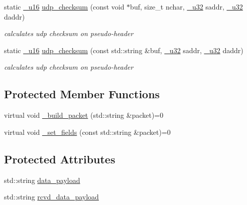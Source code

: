 \begin{CompactItemize}
static \hyperlink{namespacesocketpp_0d48e817f00cbb84d07faec41ee4b169}{\_\-u16} \hyperlink{classsocketpp_1_1RawSocket_25eef0a35fc66b33bed3abd176a5175e}{udp\_\-checksum} (const void $\ast$buf, size\_\-t nchar, \hyperlink{namespacesocketpp_d9c3b2ad093bb5814af59760e0a2192a}{\_\-u32} saddr, \hyperlink{namespacesocketpp_d9c3b2ad093bb5814af59760e0a2192a}{\_\-u32} daddr)
\begin{CompactList}\small\item\em calculates udp checksum on pseudo-header \item\end{CompactList}\item 
static \hyperlink{namespacesocketpp_0d48e817f00cbb84d07faec41ee4b169}{\_\-u16} \hyperlink{classsocketpp_1_1RawSocket_eb3d9cfc5e2893487d7e076ef56693d4}{udp\_\-checksum} (const std::string \&buf, \hyperlink{namespacesocketpp_d9c3b2ad093bb5814af59760e0a2192a}{\_\-u32} saddr, \hyperlink{namespacesocketpp_d9c3b2ad093bb5814af59760e0a2192a}{\_\-u32} daddr)
\begin{CompactList}\small\item\em calculates udp checksum on pseudo-header \item\end{CompactList}\end{CompactItemize}
\subsection*{Protected Member Functions}
\begin{CompactItemize}
\item 
virtual void \hyperlink{classsocketpp_1_1RawSocket_eb0a3f716c0fc46efa4123acf0fe1e66}{\_\-build\_\-packet} (std::string \&packet)=0
\item 
virtual void \hyperlink{classsocketpp_1_1RawSocket_45e6b041703cb8ae0f93dd19766865d5}{\_\-set\_\-fields} (const std::string \&packet)=0
\end{CompactItemize}
\subsection*{Protected Attributes}
\begin{CompactItemize}
\item 
std::string \hyperlink{classsocketpp_1_1RawSocket_4d3a1236c4ac42ab029323ae14586ff8}{data\_\-payload}
\item 
std::string \hyperlink{classsocketpp_1_1RawSocket_3e166c1c401c30b5721dc54f93772b36}{rcvd\_\-data\_\-payload}
\end{CompactItemize}


